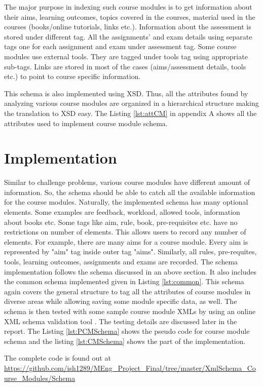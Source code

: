 \documentclass[11pt,letterpaper]{report}
\begin{document}
The major purpose in indexing such course modules is to get information about their aims, learning outcomes, topics covered in the courses, material used in the courses (books/online tutorials, links etc.). Information about the assessment is stored under different tag. All the assignments' and exam details using separate tags one for each assignment and exam under assessment tag. Some course modules use external tools. They are tagged under tools tag using appropriate sub-tags. Links are stored in most of the cases (aims/assessment details, tools etc.) to point to course specific information.     
 
This schema is also implemented using XSD. Thus, all the attributes found by analyzing various course modules are organized in a hierarchical structure making the translation to XSD easy. The Listing \ref{lst:attCM} in appendix A shows all the attributes used to implement course module schema.


\section{Implementation}
Similar to challenge problems, various course modules have different amount of information. So, the schema should be able to catch all the available information for the course modules. Naturally, the implemented schema has many optional elements. Some examples are feedback, workload, allowed tools, information about books etc. Some tags like aim, rule, book, pre-requisites etc. have no restrictions on number of elements. This allows users to record any number of elements. For example, there are many aims for a course module. Every aim is represented by "aim" tag inside outer tag "aims". Similarly, all rules, pre-requites, tools, learning outcomes, assignments and exams are recorded.    
The schema implementation follows the schema discussed in an above section. It also includes the common schema implemented given in Listing \ref{lst:common}. This schema again covers the general structure to tag all the attributes of course modules in diverse areas while allowing saving some module specific data, as well. The schema is then tested with some sample course module XMLs by using an online XML schema validation tool \cite{olXSD}. The testing details are discussed later in the report.  The Listing \ref{lst:PCMSchema} shows the pseudo code for course module schema and the listing \ref{lst:CMSchema} shows the part of the implementation.
 
The complete code is found out at \url{https://github.com/ish1289/MEng_Project_Final/tree/master/XmlSchema_Course_Modules/Schema}
\end{document}
